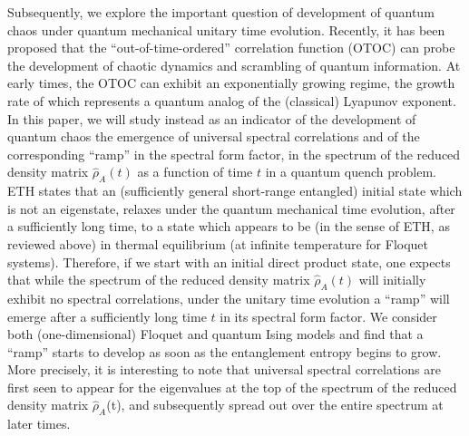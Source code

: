 \documentclass[aps,prb,preprint,onecolumn,amsmath,amssymb,superscriptaddress,eqsecnum,floatfix,scrartcl]{revtex4-1}
\begin{document}
Subsequently, we explore the important question of 
development of quantum chaos
 under quantum mechanical unitary time evolution.
 Recently, it has been  proposed that the ``out-of-time-ordered''  correlation function (OTOC) can probe the
development of chaotic dynamics
 and  scrambling of quantum information.\cite{Larkin1969,Shenker2013b,Shenker2013a,Shenker2014, Maldacena2015, Kitaev2014}
 At early times, 
the OTOC can exhibit 
an exponentially growing regime,   the growth rate of which  represents
 a quantum analog of the (classical)  Lyapunov exponent. In this paper, we will study instead as an indicator of the 
development  of quantum chaos
the  emergence  of
universal spectral correlations
and of the  corresponding  ``ramp'' in  the spectral form factor, 
in the 
spectrum of the  reduced  density matrix  ${\hat \rho}_A(t)$ as  a function of
 time $t$
 in a quantum quench problem. ETH states that  an (sufficiently general short-range entangled)  initial state 
which is not an eigenstate,
relaxes under the quantum mechanical time evolution, after  a sufficiently long time, 
to a state which appears to be (in the sense of  ETH, as reviewed above) in 
thermal equilibrium 
(at infinite temperature for Floquet systems).\cite{Srednicki1994,Deutsch1991}
 Therefore,
 if we start with an  initial direct  product state, one expects that while
the  spectrum of the reduced density matrix ${\hat  \rho}_A(t)$ will initially exhibit no
spectral correlations,
under the unitary time evolution  
a ``ramp''
  will  
emerge after a sufficiently long time $t$ in its spectral form factor.
We consider both (one-dimensional)  Floquet and quantum  Ising models and find that 
a  ``ramp''
 starts to develop 
as soon as the entanglement entropy begins to grow.
More precisely, it is interesting to note  that 
universal spectral correlations are first   seen to appear 
for the eigenvalues
at the top
of the spectrum of the reduced density matrix ${\hat  \rho}_A$(t), and subsequently  spread
out over the entire spectrum at later times.
\end{document}
